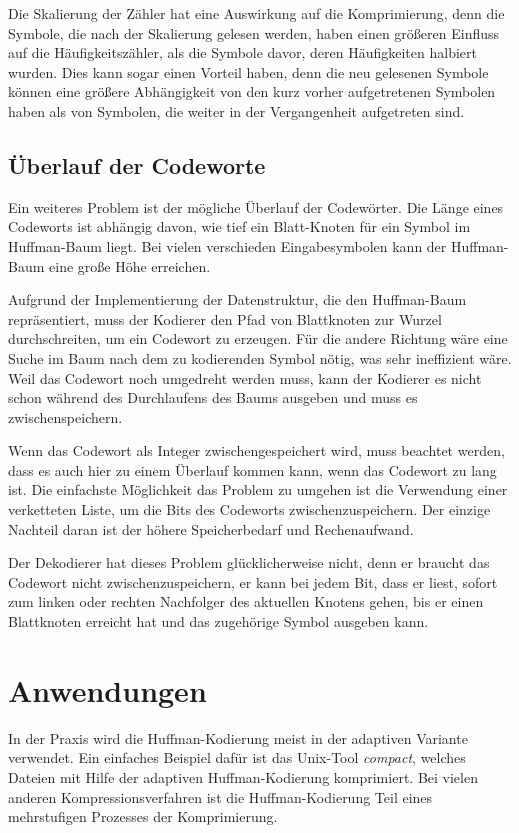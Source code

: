 \documentclass[twoside,11pt,a4paper]{article}
\theoremstyle{break}
\begin{document}
Die Skalierung der Zähler hat eine Auswirkung auf die Komprimierung,
denn die Symbole, die nach der Skalierung gelesen werden, haben einen
größeren Einfluss auf die Häufigkeitszähler, als die Symbole davor,
deren Häufigkeiten halbiert wurden. Dies kann sogar einen Vorteil
haben, denn die neu gelesenen Symbole können eine größere Abhängigkeit
von den kurz vorher aufgetretenen Symbolen haben als von Symbolen, die
weiter in der Vergangenheit aufgetreten sind.

\subsection{Überlauf der Codeworte}
Ein weiteres Problem ist der mögliche Überlauf der Codewörter. Die
Länge eines Codeworts ist abhängig davon, wie tief ein Blatt-Knoten
für ein Symbol im Huffman-Baum liegt. Bei vielen verschieden
Eingabesymbolen kann der Huffman-Baum eine große Höhe erreichen.

Aufgrund der Implementierung der Datenstruktur, die den Huffman-Baum
repräsentiert, muss der Kodierer den Pfad von Blattknoten zur Wurzel
durchschreiten, um ein Codewort zu erzeugen. Für die andere Richtung
wäre eine Suche im Baum nach dem zu kodierenden Symbol nötig, was sehr
ineffizient wäre. Weil das Codewort noch umgedreht werden muss, kann
der Kodierer es nicht schon während des Durchlaufens des Baums
ausgeben und muss es zwischenspeichern.

Wenn das Codewort als Integer zwischengespeichert wird, muss beachtet
werden, dass es auch hier zu einem Überlauf kommen kann, wenn das
Codewort zu lang ist. Die einfachste Möglichkeit das Problem zu
umgehen ist die Verwendung einer verketteten Liste, um die Bits des
Codeworts zwischenzuspeichern.  Der einzige Nachteil daran ist der
höhere Speicherbedarf und Rechenaufwand.

Der Dekodierer hat dieses Problem glücklicherweise nicht, denn er
braucht das Codewort nicht zwischenzuspeichern, er kann bei jedem Bit,
dass er liest, sofort zum linken oder rechten Nachfolger des aktuellen
Knotens gehen, bis er einen Blattknoten erreicht hat und das
zugehörige Symbol ausgeben kann.

\section{Anwendungen}
In der Praxis wird die Huffman-Kodierung meist in der adaptiven
Variante verwendet. Ein einfaches Beispiel dafür ist das Unix-Tool
\emph{compact}, welches Dateien mit Hilfe der adaptiven
Huffman-Kodierung komprimiert. Bei vielen anderen
Kompressionsverfahren ist die Huffman-Kodierung Teil eines
mehrstufigen Prozesses der Komprimierung. \cite[S. 234]{Salomon:2010}
\end{document}
